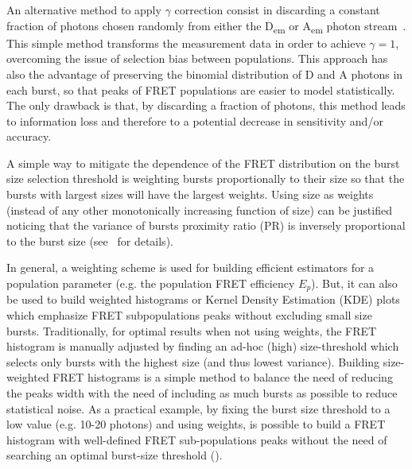 \documentclass[10pt,letterpaper]{article}
\begin{document}
An alternative method to apply $\gamma$ correction consist in
discarding a constant fraction of photons chosen randomly from either 
the D\textsubscript{em} or A\textsubscript{em} photon stream~\cite{Nir_2006}. This 
simple method transforms the measurement data in order to
achieve $\gamma=1$, overcoming the issue of selection bias between populations.
This approach has also the advantage of preserving
the binomial distribution of D and A photons in each burst, so that peaks
of FRET populations are easier to model statistically.
The only drawback is that, by discarding a fraction of photons,
this method leads to information loss and therefore to a potential 
decrease in sensitivity and/or accuracy.

A simple way to mitigate the dependence of the FRET distribution on
the burst size selection threshold is weighting bursts proportionally to their size
so that the bursts with largest sizes will have the largest weights.
Using size as weights (instead of any other monotonically increasing function
of size) can be justified noticing that the variance of bursts proximity ratio (PR) is
inversely proportional to the burst size (see~ for details). %

In general, a weighting scheme is used for building efficient estimators for a population
parameter (e.g. the population FRET efficiency $E_p$).
But, it can also be used to build weighted histograms or Kernel Density
Estimation (KDE) plots which emphasize FRET subpopulations peaks
without excluding small size bursts.
Traditionally, for optimal results when not using weights, the
FRET histogram is manually adjusted by finding an ad-hoc (high)
size-threshold which selects only bursts with the highest size (and thus lowest variance).
Building size-weighted FRET histograms is a simple method to balance
the need of reducing the peaks width with the need of including as much bursts
as possible to reduce statistical noise.
As a practical example, by fixing the burst size threshold to a low value (e.g. 10-20 photons)
and using weights, is possible to build a FRET histogram with well-defined FRET sub-populations peaks
without the need of searching an optimal burst-size threshold ().
\end{document}
